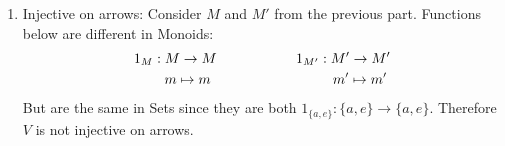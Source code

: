 \begin{enumerate}[label=\ilabel]
    \item
        Injective on arrows: Consider $M$ and $M'$ from the previous part. Functions below are different in Monoids:
        \begin{gather*}
            1_M: M \to M \hspace{2cm}
            1_{M'}: M' \to M' \\
            \phantom{1_M: }m \mapsto m \hspace{2.3cm}
            \phantom{1_{M'}: }m' \mapsto m' 
        \end{gather*}
        But are the same in Sets since they are both $1_{\{a, e\}}: \{a, e\} \to \{a, e\}$. Therefore $V$ is not injective on arrows.
\end{enumerate}